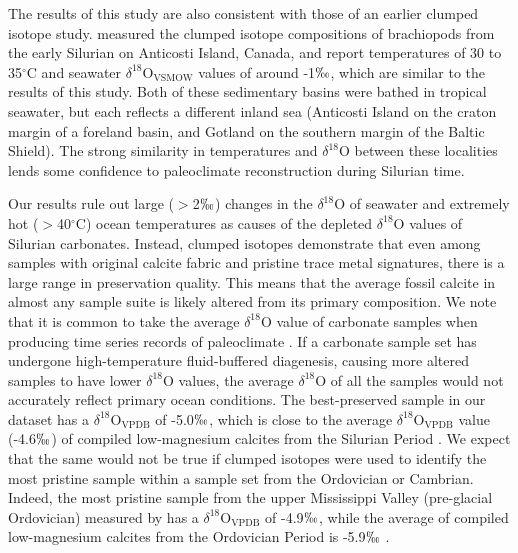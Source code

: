 \documentclass[5p, authoryear]{elsarticle}
\begin{document}
The results of this study are also consistent with those of an earlier clumped isotope study. \cite{Came2007} measured the clumped isotope compositions of brachiopods from the early Silurian on Anticosti Island, Canada, and report temperatures of 30 to 35$^{\circ}$C and seawater $\delta^{18}$O$_{\text{VSMOW}}$ values of around -1$\permil$, which are similar to the results of this study. Both of these sedimentary basins were bathed in tropical seawater, but each reflects a different inland sea (Anticosti Island on the craton margin of a foreland basin, and Gotland on the southern margin of the Baltic Shield). The strong similarity in temperatures and $\delta^{18}$O between these localities lends some confidence to paleoclimate reconstruction during Silurian time. 

Our results rule out large ($>$2$\permil$) changes in the $\delta^{18}$O of seawater and extremely hot ($>$40$^{\circ}$C) ocean temperatures as causes of the depleted $\delta^{18}$O values of Silurian carbonates. Instead, clumped isotopes demonstrate that even among samples with original calcite fabric and pristine trace metal signatures, there is a large range in preservation quality. This means that the average fossil calcite in almost any sample suite is likely altered from its primary composition. We note that it is common to take the average $\delta^{18}$O value of carbonate samples when producing time series records of paleoclimate \citep{Bickert1997, Jaffres2007, Munnecke2003, Shields2003, Veizer2000}.  If a carbonate sample set has undergone high-temperature fluid-buffered diagenesis, causing more altered samples to have lower $\delta^{18}$O values, the average $\delta^{18}$O of all the samples would not accurately reflect primary ocean conditions. The best-preserved sample in our dataset has a $\delta^{18}$O$_{\text{VPDB}}$ of -5.0$\permil$, which is close to the average $\delta^{18}$O$_{\text{VPDB}}$ value (-4.6$\permil$) of compiled low-magnesium calcites from the Silurian Period \citep{Veizer1999}. We expect that the same would not be true if clumped isotopes were used to identify the most pristine sample within a sample set from the Ordovician or Cambrian. Indeed, the most pristine sample from the upper Mississippi Valley (pre-glacial Ordovician) measured by \cite{Finnegan2011} has a $\delta^{18}$O$_{\text{VPDB}}$ of -4.9$\permil$, while the average of compiled low-magnesium calcites from the Ordovician Period is -5.9$\permil$ \citep{Veizer1999}. 
\end{document}
